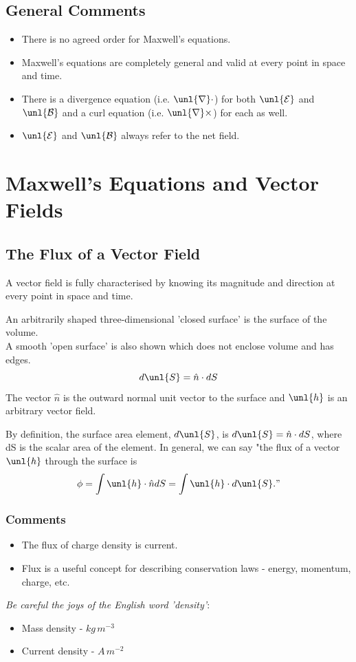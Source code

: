 \documentclass[a4paper, 11pt, normalem]{report}
\newcommand\E{\mathcal{E}}
\newcommand\uE{\unl{\E}}
\newcommand\B{\mathcal{B}}
\newcommand\uB{\unl{\B}}
\newcommand\del{\unl{\nabla}}
\newcommand\hn{\hat{n}}
\begin{document}
\subsection{General Comments}
\begin{itemize}
    \item There is no agreed order for Maxwell's equations.
    \item Maxwell's equations are completely general and valid at every point in space and time.
    \item There is a divergence equation (i.e. $\del \cdot$) for both $\uE$ and $\uB$ and a curl equation (i.e. $\del \times$) for each as well.
    \item $\uE$ and $\uB$ always refer to the net field.
\end{itemize}

\section{Maxwell's Equations and Vector Fields}
\subsection{The Flux of a Vector Field}
A vector field is fully characterised by knowing its magnitude and direction at every point in space and time.

An arbitrarily shaped three-dimensional 'closed surface' is the surface of the volume. \\
A smooth 'open surface' is also shown which does not enclose volume and has edges.
\begin{equation}
    d\unl{S} = \hn \cdot dS
\end{equation}
The vector $\hn$ is the outward normal unit vector to the surface and $\unl{h}$ is an arbitrary vector field.

By definition, the surface area element, $d\unl{S}$, is $d\unl{S} = \hn \cdot dS$, where dS is the scalar area of the element.
In general, we can say "the flux of a vector $\unl{h}$ through the surface is
\begin{equation}
    \phi = \int \unl{h} \cdot \hn dS = \int \unl{h} \cdot d\unl{S}."
\end{equation}

\subsubsection{Comments}
\begin{itemize}
    \item The flux of charge density is current.
    \item Flux is a useful concept for describing conservation laws - energy, momentum, charge, etc.
\end{itemize}
\emph{Be careful the joys of the English word 'density'}:
\begin{itemize}
    \item Mass density - $kg\,m^{-3}$
    \item Current density - $A\,m^{-2}$
\end{itemize}
\end{document}
